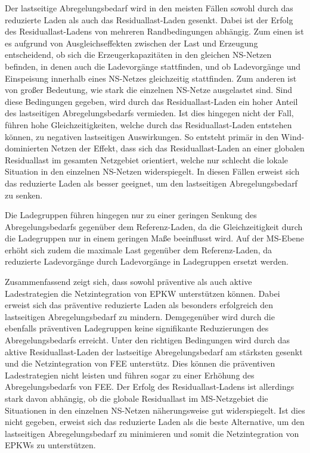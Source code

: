 Der lastseitige Abregelungsbedarf wird in den meisten Fällen sowohl durch das reduzierte Laden als auch das Residuallast-Laden gesenkt.
Dabei ist der Erfolg des Residuallast-Ladens von mehreren Randbedingungen abhängig.
Zum einen ist es aufgrund von Ausgleichseffekten zwischen der Last und Erzeugung entscheidend, ob sich die Erzeugerkapazitäten in den gleichen \gls{NS}-Netzen befinden, in denen auch die Ladevorgänge stattfinden, und ob Ladevorgänge und Einspeisung innerhalb eines \gls{NS}-Netzes gleichzeitig stattfinden.
Zum anderen ist von großer Bedeutung, wie stark die einzelnen \gls{NS}-Netze ausgelastet sind.
Sind diese Bedingungen gegeben, wird durch das Residuallast-Laden ein hoher Anteil des lastseitigen Abregelungsbedarfs vermieden.
Ist dies hingegen nicht der Fall, führen hohe Gleichzeitigkeiten, welche durch das Residuallast-Laden entstehen können, zu negativen lastseitigen Auswirkungen.
So entsteht primär in den Wind-dominierten Netzen der Effekt, dass sich das Residuallast-Laden an einer globalen Residuallast im gesamten Netzgebiet orientiert, welche nur schlecht die lokale Situation in den einzelnen \gls{NS}-Netzen widerspiegelt.
In diesen Fällen erweist sich das reduzierte Laden als besser geeignet, um den lastseitigen Abregelungsbedarf zu senken.

Die Ladegruppen führen hingegen nur zu einer geringen Senkung des Abregelungsbedarfs gegenüber dem Referenz-Laden, da die Gleichzeitigkeit durch die Ladegruppen nur in einem geringen Maße beeinflusst wird.
Auf der \gls{MS}-Ebene erhöht sich zudem die maximale Last gegenüber dem Referenz-Laden, da reduzierte Ladevorgänge durch Ladevorgänge in Ladegruppen ersetzt werden.\medskip

Zusammenfassend zeigt sich, dass sowohl präventive als auch aktive Ladestrategien die Netzintegration von \gls{EPKW} unterstützen können.
Dabei erweist sich das präventive reduzierte Laden als besonders erfolgreich den lastseitigen Abregelungsbedarf zu mindern.
Demgegenüber wird durch die ebenfalls präventiven Ladegruppen keine signifikante Reduzierungen des Abregelungsbedarfs erreicht.
Unter den richtigen Bedingungen wird durch das aktive Residuallast-Laden der lastseitige Abregelungsbedarf am stärksten gesenkt und die Netzintegration von \gls{FEE} unterstütz.
Dies können die präventiven Ladestrategien nicht leisten und führen sogar zu einer Erhöhung des Abregelungsbedarfs von \gls{FEE}.
Der Erfolg des Residuallast-Ladens ist allerdings stark davon abhängig, ob die globale Residuallast im \gls{MS}-Netzgebiet die Situationen in den einzelnen \gls{NS}-Netzen näherungsweise gut widerspiegelt.
Ist dies nicht gegeben, erweist sich das reduzierte Laden als die beste Alternative, um den lastseitigen Abregelungsbedarf zu minimieren und somit die Netzintegration von \glspl{EPKW} zu unterstützen.\bigskip

